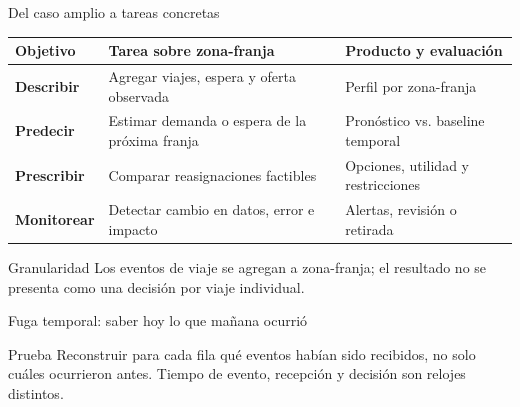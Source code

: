 \documentclass[aspectratio=169,11pt]{beamer}
\newcommand{\br}{\\}
\begin{document}
\begin{frame}{Del caso amplio a tareas concretas}
  \small
  \begin{tabularx}{\textwidth}{>{\bfseries}p{} X X}
    \toprule
    Objetivo & Tarea sobre zona-franja & Producto y evaluación \\
    \midrule
    Describir & Agregar viajes, espera y oferta observada & Perfil por zona-franja \\
    Predecir & Estimar demanda o espera de la próxima franja & Pronóstico vs. baseline temporal \\
    Prescribir & Comparar reasignaciones factibles & Opciones, utilidad y restricciones \\
    Monitorear & Detectar cambio en datos, error e impacto & Alertas, revisión o retirada \\
    \bottomrule
  \end{tabularx}
  \vfill
  \begin{block}{Granularidad}
    Los eventos de viaje se agregan a zona-franja; el resultado no se presenta como una decisión por viaje individual.
  \end{block}
\end{frame}

\begin{frame}{Fuga temporal: saber hoy lo que mañana ocurrió}
  \centering
  \vfill
  \begin{block}{Prueba}
    Reconstruir para cada fila qué eventos habían sido recibidos, no solo cuáles ocurrieron antes. Tiempo de evento, recepción y decisión son relojes distintos.
  \end{block}
\end{frame}
\end{document}
